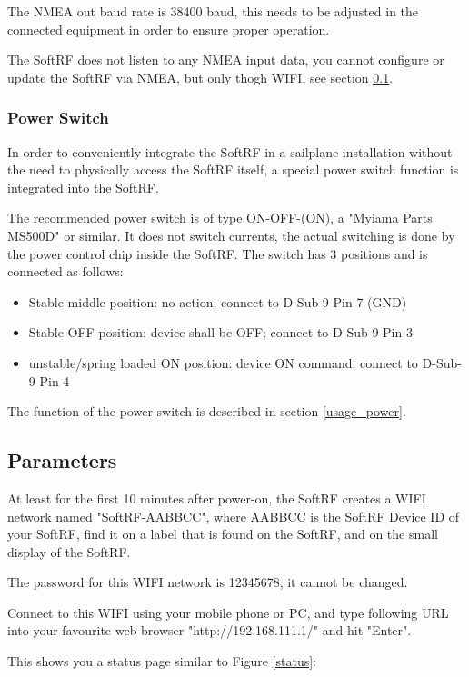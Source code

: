 \documentclass[11pt,a4paper]{article}
\begin{document}
The NMEA out baud rate is 38400 baud, this needs to be adjusted in the connected equipment in order to ensure proper operation.

The SoftRF does not listen to any NMEA input data, you cannot configure or update the SoftRF via NMEA, but only thogh WIFI, see section \ref{parameters}.

\subsubsection{Power Switch}
In order to conveniently integrate the SoftRF in a sailplane installation without the need to physically access the SoftRF itself, a special power switch function is integrated into the SoftRF. 

The recommended power switch is of type ON-OFF-(ON), a "Myiama Parts MS500D" or similar. It does not switch currents, the actual switching is done by the power control chip inside the SoftRF. The switch has 3 positions and is connected as follows:

\begin{itemize}
\item Stable middle position: no action; connect to D-Sub-9 Pin 7 (GND)
\item Stable OFF position: device shall be OFF; connect to D-Sub-9 Pin 3
\item unstable/spring loaded ON position: device ON command; connect to D-Sub-9 Pin 4
\end{itemize}

The function of the power switch is described in section \ref{usage_power}.

\subsection{Parameters}\label{parameters}
At least for the first 10 minutes after power-on, the SoftRF creates a WIFI network named "SoftRF-AABBCC", where AABBCC is the SoftRF Device ID of your SoftRF, find it on a label that is found on the SoftRF, and on the small display of the SoftRF.

The password for this WIFI network is 12345678, it cannot be changed.

Connect to this WIFI using your mobile phone or PC, and type following URL into your favourite web browser "http://192.168.111.1/" and hit "Enter".

This shows you a status page similar to Figure \ref{status}:
\end{document}
